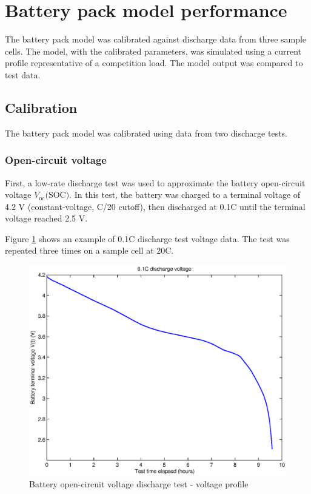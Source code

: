 \documentclass[../SimBALink.tex]{subfiles}
\begin{document}
\section{Battery pack model performance}
	The battery pack model was calibrated against discharge data from three sample cells. The model, with the calibrated parameters, was simulated using a current profile representative of a competition load. The model output was compared to test data.
	\subsection{Calibration}
		The battery pack model was calibrated using data from two discharge tests.
		
		\subsubsection{Open-circuit voltage}
			First, a low-rate discharge test was used to approximate the battery open-circuit voltage $V_\text{oc}(\text{SOC)}$. In this test, the battery was charged to a terminal voltage of 4.2 V (constant-voltage, C/20 cutoff), then discharged at 0.1C until the terminal voltage reached 2.5 V.  
			
			Figure \ref{fig:0.1C_Discharge_Voltage_Profile} shows an example of 0.1C discharge test voltage data. The test was repeated three times on a sample cell at 20\degree C.
		
			\begin{figure}[h!]
				\centering
				\includegraphics[width=5in]{0.1C_Discharge_Voltage_Profile}
				\caption{Battery open-circuit voltage discharge test - voltage profile}
				\label{fig:0.1C_Discharge_Voltage_Profile}
			\end{figure}
		
\end{document}

